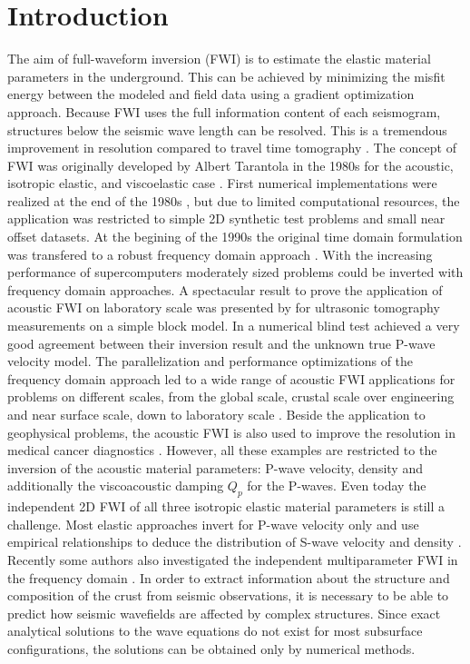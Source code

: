 \documentclass[pdftex,a4paper,parskip,listof=totoc,bibliography=totoc,onehalfspacing,12pt]{scrreprt}
\begin{document}
\chapter*{Introduction}
 
The aim of full-waveform inversion (FWI) is to estimate the elastic material parameters in the underground. This can be achieved by minimizing the misfit energy between the modeled and field data using a gradient optimization
approach. Because FWI uses the full information content of each seismogram, structures below the seismic wave length can be resolved. This is a tremendous improvement in resolution compared to travel time tomography \citep{pratt:02}. The concept of FWI was originally developed by Albert Tarantola in the 1980s for the acoustic, isotropic elastic, and viscoelastic case \citep{tarantola:84a,tarantola:84b,tarantola:86,tarantola:88}. First numerical implementations were realized at the end of the 1980s \citep{gauthier:86,mora:87,pica:90}, but due to limited computational resources, the application was restricted to simple 2D synthetic test problems and small near offset datasets. At the begining of the 1990s the original time domain formulation was transfered to a robust frequency domain approach \citep{pratt:90a,pratt:90b}. With the increasing performance of supercomputers moderately sized problems could be inverted with frequency domain approaches. A spectacular result to prove the application of acoustic FWI on laboratory scale was presented by \cite{pratt:99} for ultrasonic tomography measurements on a simple block model. In a numerical blind test \cite{brenders:07} achieved a very good agreement between their inversion result and the unknown true P-wave velocity model. The parallelization and performance optimizations of the frequency domain approach \citep[see e.g. ][]{sourbier:09a,sourbier:09b} led to a wide range of acoustic FWI applications for problems on different scales, from the global scale, crustal scale over engineering and near surface scale, down to laboratory scale \citep{pratt:04}. Beside the application to geophysical problems, the acoustic FWI is also used to improve the resolution in medical cancer diagnostics \citep{pratt:07}. However, all these examples are restricted to the inversion of the acoustic material parameters: P-wave velocity, density and additionally the viscoacoustic damping $Q_p$ for the P-waves. Even today the independent 2D FWI of all three isotropic elastic material parameters is still a challenge. Most elastic approaches invert for P-wave velocity only and use empirical relationships to deduce the distribution of S-wave velocity and density \citep{shipp:02,sheen:06}. Recently some authors also investigated the independent multiparameter FWI in the frequency domain \citep{choi:08a,choi:08b,brossier:09}.
In order to extract information about the structure and composition of the crust from seismic observations, it is necessary to be able to predict how seismic wavefields are affected by complex structures. Since exact analytical
solutions to the wave equations do not exist for most subsurface configurations, the solutions can be obtained only by numerical methods. 
\end{document}
